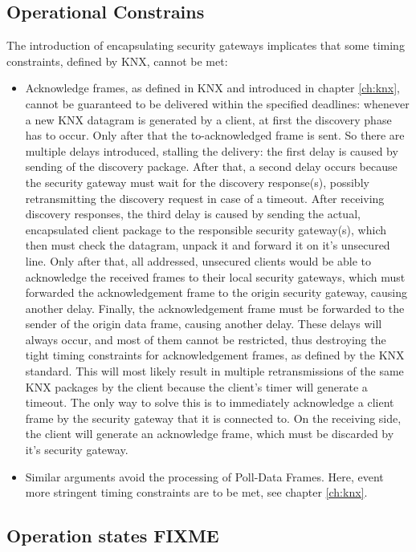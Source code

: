 \subsection{Operational Constrains}

The introduction of encapsulating security gateways implicates that some timing constraints, defined by KNX, cannot be met:

\begin{itemize}
 \item Acknowledge frames, as defined in KNX and introduced in chapter \ref{ch:knx}, cannot be guaranteed to be delivered within the specified deadlines: whenever
 a new KNX datagram is generated by a client, at first the discovery phase has to occur. Only after that the to-acknowledged frame is sent. So there are
 multiple delays introduced, stalling the delivery: the first delay is caused by sending of the discovery package.
 After that, a second delay occurs because the security gateway must wait for the discovery response(s), possibly retransmitting the discovery request
 in case of a timeout. After receiving discovery responses, the third delay is caused by sending the actual, encapsulated
 client package to the responsible security gateway(s), which then must check the datagram, unpack it and forward it on it's unsecured line.
 Only after that, all addressed, unsecured clients would be able to acknowledge the received frames
 to their local security gateways,
 which must forwarded the acknowledgement frame to the origin security gateway, causing another delay. Finally, the acknowledgement frame must be forwarded to the sender of
 the origin data frame, causing another delay.
 These delays will always occur, and most of them cannot be restricted, thus destroying the tight timing constraints for acknowledgement frames, as defined
 by the KNX standard. This
 will most likely result in multiple retransmissions of the same KNX packages
 by the client because the client's timer will generate a timeout. The only way to solve this is to immediately acknowledge a client frame by the security
 gateway that it is connected to. On the receiving side, the client will generate an acknowledge
 frame, which must be discarded by it's security gateway.
 \item Similar arguments avoid the processing of Poll-Data Frames. Here, event more stringent timing constraints are to be met, see chapter \ref{ch:knx}. 
\end{itemize}

\subsection{Operation states FIXME}

